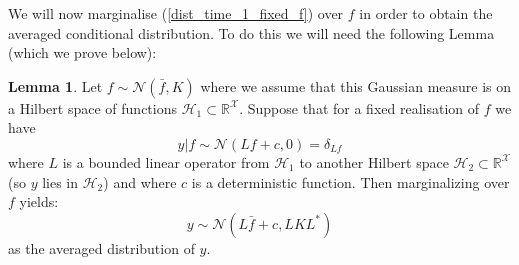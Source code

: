 \documentclass{article}
\theoremstyle{definition}
\newtheorem{lemma}[theorem]{Lemma}
\theoremstyle{remark}
\theoremstyle{remark}
\begin{document}
We will now marginalise (\ref{dist_time_1_fixed_f}) over $f$ in order to obtain the averaged conditional distribution. To do this we will need the following Lemma (which we prove below): \vspace{10pt}
\begin{lemma}
    Let $f\sim\mathcal{N}(\bar{f},K)$ where we assume that this Gaussian measure is on a Hilbert space of functions $\mathcal{H}_{1}\subset\mathbb{R}^{\mathcal{X}}$. Suppose that for a fixed realisation of $f$ we have
    \begin{equation*}
        y|f\sim\mathcal{N}(Lf+c,0)=\delta_{Lf}
    \end{equation*}
    where $L$ is a bounded linear operator from $\mathcal{H}_{1}$ to another Hilbert space $\mathcal{H}_{2}\subset\mathbb{R}^{\mathcal{X}}$ (so $y$ lies in $\mathcal{H}_{2}$) and where $c$ is a deterministic function. Then marginalizing over $f$ yields:
    \begin{equation*}
        y\sim\mathcal{N}(L\bar{f}+c,LKL^{*})
    \end{equation*}
    as the averaged distribution of $y$.
\end{lemma}
\end{document}

